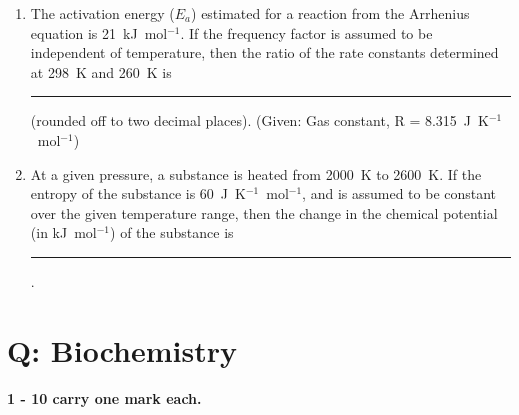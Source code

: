 \documentclass[journal,12pt,onecolumn]{IEEEtran}
\begin{document}
\begin{enumerate}[label=\arabic*., start=6]
\item The activation energy ($E_a$) estimated for a reaction from the Arrhenius equation is 21~kJ~mol$^{-1}$. If the frequency factor is assumed to be independent of temperature, then the ratio of the rate constants determined at 298~K and 260~K is \rule{3cm}{0.1pt} (rounded off to two decimal places). (Given: Gas constant, R = 8.315~J~K$^{-1}$~mol$^{-1}$)


\item At a given pressure, a substance is heated from 2000~K to 2600~K. If the entropy of the substance is 60~J~K$^{-1}$~mol$^{-1}$, and is assumed to be constant over the given temperature range, then the change in the chemical potential (in kJ~mol$^{-1}$) of the substance is \rule{3cm}{0.1pt}.

\end{enumerate}
\newpage
\section*{\centering  Q: Biochemistry}
\noindent \textbf{1 - 10 carry one mark each.}
\end{document}
